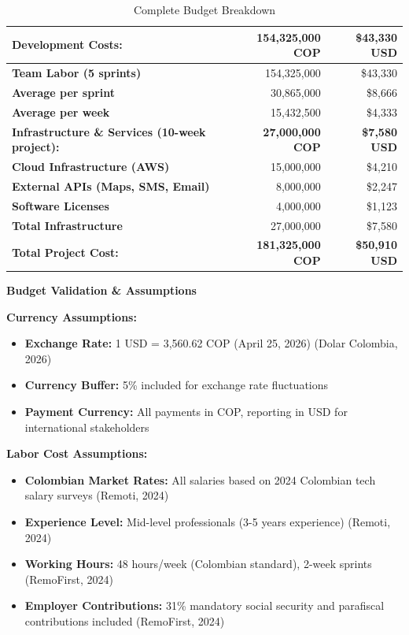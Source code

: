 \documentclass[12pt,a4paper]{article}
\begin{document}
\begin{table}[h]
\centering
\caption{Complete Budget Breakdown}
\label{tab:complete}
\begin{tabular}{|l|r|r|}
\hline
\textbf{Development Costs:} & \textbf{154,325,000 COP} & \textbf{\$43,330 USD} \\
\hline
\textbf{Team Labor (5 sprints)} & 154,325,000 & \$43,330 \\
\textbf{Average per sprint} & 30,865,000 & \$8,666 \\
\textbf{Average per week} & 15,432,500 & \$4,333 \\
\hline
\textbf{Infrastructure \& Services (10-week project):} & \textbf{27,000,000 COP} & \textbf{\$7,580 USD} \\
\hline
\textbf{Cloud Infrastructure (AWS)} & 15,000,000 & \$4,210 \\
\textbf{External APIs (Maps, SMS, Email)} & 8,000,000 & \$2,247 \\
\textbf{Software Licenses} & 4,000,000 & \$1,123 \\
\textbf{Total Infrastructure} & 27,000,000 & \$7,580 \\
\hline
\textbf{Total Project Cost:} & \textbf{181,325,000 COP} & \textbf{\$50,910 USD} \\
\hline
\end{tabular}
\end{table}

\textbf{Budget Validation \& Assumptions}

\textbf{Currency Assumptions:}
\begin{itemize}
    \item \textbf{Exchange Rate:} 1 USD = 3,560.62 COP (April 25, 2026) (Dolar Colombia, 2026)
    \item \textbf{Currency Buffer:} 5\% included for exchange rate fluctuations
    \item \textbf{Payment Currency:} All payments in COP, reporting in USD for international stakeholders
\end{itemize}

\textbf{Labor Cost Assumptions:}
\begin{itemize}
    \item \textbf{Colombian Market Rates:} All salaries based on 2024 Colombian tech salary surveys (Remoti, 2024)
    \item \textbf{Experience Level:} Mid-level professionals (3-5 years experience) (Remoti, 2024)
    \item \textbf{Working Hours:} 48 hours/week (Colombian standard), 2-week sprints (RemoFirst, 2024)
    \item \textbf{Employer Contributions:} 31\% mandatory social security and parafiscal contributions included (RemoFirst, 2024)
\end{itemize}
\end{document}
